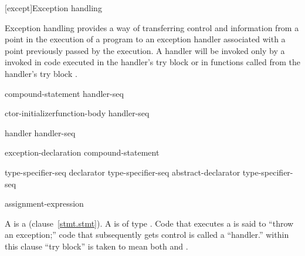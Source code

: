 [except]{Exception handling}%


%

\pnum
Exception handling provides a way of transferring control and information
from a point in the execution of a program to an exception handler
associated with a point previously passed by the execution.
A handler will be invoked only by a
invoked in code executed in the handler's try block
or in functions called from the handler's try block .

%
%
\begin{bnf}
\br
     compound-statement handler-seq
\end{bnf}

%
%
\begin{bnf}
\br
     ctor-initializer\opt function-body handler-seq
\end{bnf}

\begin{bnf}
\br
    handler handler-seq\opt
\end{bnf}

%
%
\begin{bnf}
\br
     exception-declaration \terminal{)} compound-statement
\end{bnf}

\begin{bnf}
\br
    type-specifier-seq declarator\br
    type-specifier-seq abstract-declarator\br
    type-specifier-seq\br
\end{bnf}

%
%
\begin{bnf}
\br
      assignment-expression\opt
\end{bnf}

%
%
%
%
A  is a  (clause~\ref{stmt.stmt}).
A  is of type . Code that executes a
 is said to ``throw an exception;'' code that
subsequently gets control is called a ``handler.'' \enternote within this clause
``try block'' is taken to mean both  and
. \exitnote

